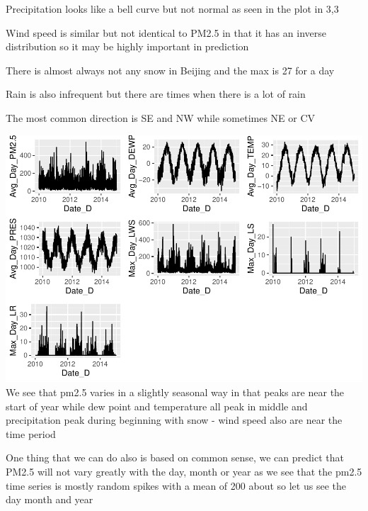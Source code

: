 \documentclass[
]{article}
\begin{document}
Precipitation looks like a bell curve but not normal as seen in the plot
in 3,3

Wind speed is similar but not identical to PM2.5 in that it has an
inverse distribution so it may be highly important in prediction

There is almost always not any snow in Beijing and the max is 27 for a
day

Rain is also infrequent but there are times when there is a lot of rain

The most common direction is SE and NW while sometimes NE or CV

\includegraphics{Final_Project_1_files/figure-latex/unnamed-chunk-5-1.pdf}
We see that pm2.5 varies in a slightly seasonal way in that peaks are
near the start of year while dew point and temperature all peak in
middle and precipitation peak during beginning with snow - wind speed
also are near the time period

One thing that we can do also is based on common sense, we can predict
that PM2.5 will not vary greatly with the day, month or year as we see
that the pm2.5 time series is mostly random spikes with a mean of 200
about so let us see the day month and year
\end{document}
